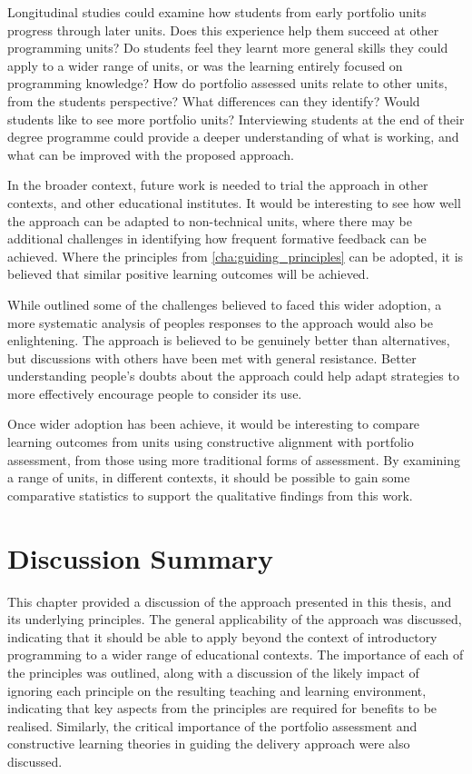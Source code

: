 Longitudinal studies could examine how students from early portfolio units progress through later units. Does this experience help them succeed at other programming units? Do students feel they learnt more general skills they could apply to a wider range of units, or was the learning entirely focused on programming knowledge? How do portfolio assessed units relate to other units, from the students perspective? What differences can they identify? Would students like to see more portfolio units? Interviewing students at the end of their degree programme could provide a deeper understanding of what is working, and what can be improved with the proposed approach.

In the broader context, future work is needed to trial the approach in other contexts, and other educational institutes. It would be interesting to see how well the approach can be adapted to non-technical units, where there may be additional challenges in identifying how frequent formative feedback can be achieved. Where the principles from \cref{cha:guiding_principles} can be adopted, it is believed that similar positive learning outcomes will be achieved.

While  outlined some of the challenges believed to faced this wider adoption, a more systematic analysis of peoples responses to the approach would also be enlightening. The approach is believed to be genuinely better than alternatives, but discussions with others have been met with general resistance. Better understanding people's doubts about the approach could help adapt strategies to more effectively encourage people to consider its use.

Once wider adoption has been achieve, it would be interesting to compare learning outcomes from units using constructive alignment with portfolio assessment, from those using more traditional forms of assessment. By examining a range of units, in different contexts, it should be possible to gain some comparative statistics to support the qualitative findings from this work.


\section{Discussion Summary} %
\label{sec:disc_summary}

This chapter provided a discussion of the approach presented in this thesis, and its underlying principles. The general applicability of the approach was discussed, indicating that it should be able to apply beyond the context of introductory programming to a wider range of educational contexts. The importance of each of the principles was outlined, along with a discussion of the likely impact of ignoring each principle on the resulting teaching and learning environment, indicating that key aspects from the principles are required for benefits to be realised. Similarly, the critical importance of the portfolio assessment and constructive learning theories in guiding the delivery approach were also discussed.

